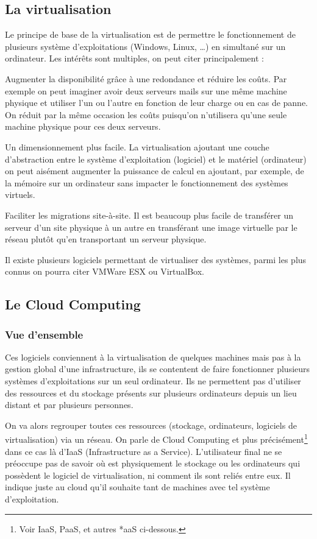\documentclass[a4paper,oneside]{report}
\begin{document}
\subsection{La virtualisation}
Le principe de base de la virtualisation est de permettre le fonctionnement de plusieurs système d’exploitations (Windows, Linux, …) en simultané sur un ordinateur.
Les intérêts sont multiples, on peut citer principalement :\newline

Augmenter la disponibilité grâce à une redondance et réduire les coûts.
Par exemple on peut imaginer avoir deux serveurs mails sur une même machine physique et utiliser l’un ou l’autre en fonction de leur charge ou en cas de panne.
On réduit par la même occasion les coûts puisqu’on n’utilisera qu’une seule machine physique pour ces deux serveurs.

Un dimensionnement plus facile. La virtualisation ajoutant une couche d’abstraction entre le système d’exploitation (logiciel) et le matériel (ordinateur) on peut aisément augmenter la puissance de calcul en ajoutant, par exemple, de la mémoire sur un ordinateur sans impacter le fonctionnement des systèmes virtuels.

Faciliter les migrations site-à-site.
Il est beaucoup plus facile de transférer un serveur d’un site physique à un autre en transférant une image virtuelle par le réseau plutôt qu’en transportant un serveur physique.\newline

Il existe plusieurs logiciels permettant de virtualiser des systèmes, parmi les plus connus on pourra citer VMWare ESX ou VirtualBox.

\subsection{Le Cloud Computing}
\subsubsection{Vue d'ensemble}
Ces logiciels conviennent à la virtualisation de quelques machines mais pas à la gestion global d'une infrastructure, ils se contentent de faire fonctionner plusieurs systèmes d’exploitations sur un seul ordinateur.
Ils ne permettent pas d'utiliser des ressources et du stockage présents sur plusieurs ordinateurs depuis un lieu distant et par plusieurs personnes.

On va alors regrouper toutes ces ressources (stockage, ordinateurs, logiciels de virtualisation) via un réseau.
On parle de Cloud Computing et plus précisément\footnote{Voir \og IaaS, PaaS, et autres *aaS \fg ci-dessous.} dans ce cas là d’IaaS (Infrastructure as a Service).
L'utilisateur final ne se préoccupe pas de savoir où est physiquement le stockage ou les ordinateurs qui possèdent le logiciel de virtualisation, ni comment ils sont reliés entre eux. Il indique juste au cloud qu’il souhaite tant de machines avec tel système d'exploitation.
\end{document}
